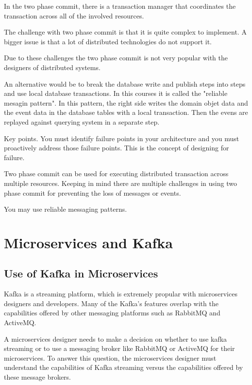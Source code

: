 In the two phase commit, there is a transaction manager that coordinates the transaction across all of the involved resources.

The challenge with two phase commit is that it is quite complex to implement.
A bigger issue is that a lot of distributed technologies do not support it.

Due to these challenges the two phase commit is not very popular with the designers of distributed systems.


An alternative would be to break the database write and publish steps into steps and use local database transactions.
In this courses it is called the "reliable mesagin pattern". In this pattern, the right side writes the domain objet data and the event data in the database tables with a local transaction.
Then the evens are replayed against querying system in a separate step.

Key points.
You must identify failure points in your architecture and you must proactively address those failure points.
This is the concept of designing for failure.

Two phase commit can be used for executing distributed transaction across multiple resources.
Keeping in mind there are multiple challenges in using two phase commit for preventing the loss of messages or events.

You may use reliable messaging patterns.



\chapter{Microservices and Kafka}



\section{Use of Kafka in Microservices}

Kafka is a streaming platform, which is extremely propular with microservices designers and developers.
Many of the Kafka's features overlap with the capabilities offered by other messaging platforms such as RabbitMQ and ActiveMQ.

A microservices designer needs to make a decision on whether to use kafka streaming or to use a messaging broker like RabbitMQ or ActiveMQ for their microservices.
To answer this question, the microservices designer must understand the capabilities of Kafka streaming versus the capabilities offered by these message brokers.


